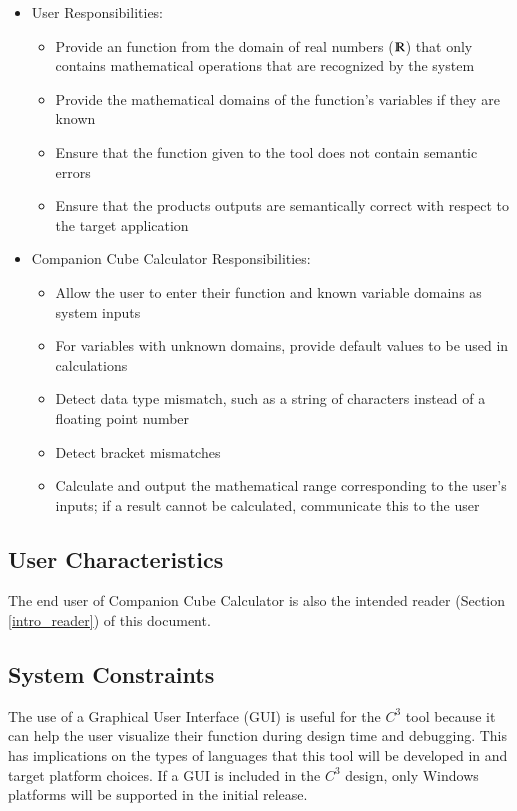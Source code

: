 \documentclass[12pt]{article}
\newcommand{\progname}{Companion Cube Calculator} %
\newcommand{\prognameAbbrv}{$C^{3}$}
\begin{document}
\begin{itemize}
	\item User Responsibilities:
	\begin{itemize}
		\item Provide an function from the domain of real numbers 
		($\varmathbb{R}$) that only contains mathematical operations that are 
		recognized by the system
		\item Provide the mathematical domains of the function's variables if 
		they are known
		\item Ensure that the function given to the tool does not contain 
		semantic errors
		\item Ensure that the products outputs are semantically correct with 
		respect to the target application
	\end{itemize}
	\item \progname{} Responsibilities:
	\begin{itemize}
		\item Allow the user to enter their function and known variable domains 
		as system inputs
		\item For variables with unknown domains, provide default values to be 
		used in calculations
		\item Detect data type mismatch, such as a string of characters instead 
		of a floating point number
		\item Detect bracket mismatches
		\item Calculate and output the mathematical range corresponding to the 
		user's inputs; if a result cannot be calculated, communicate this to 
		the user
	\end{itemize}
\end{itemize}

\subsection{User Characteristics} \label{SecUserCharacteristics}
The end user of \progname{} is also the intended reader (Section 
\ref{intro_reader}) of this document.

\subsection{System Constraints}
The use of a Graphical User Interface (GUI) is useful for the \prognameAbbrv{} 
tool because it can help the user visualize their function during design time 
and debugging. This has implications on the types of languages that this tool 
will be developed in and target platform choices. If a GUI is included in the 
\prognameAbbrv{} design, only Windows platforms will be supported in the 
initial release.
\end{document}
